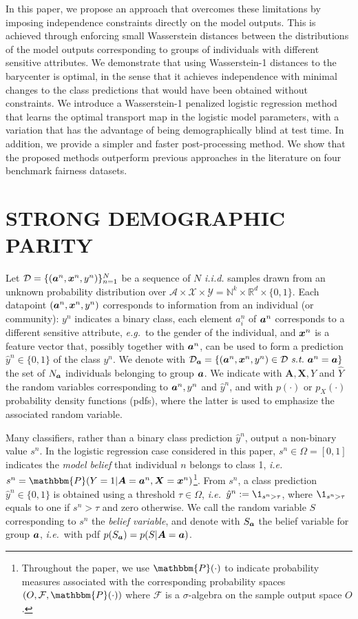 \documentclass[letterpaper]{article}
\newcommand{\ie}{\emph{i.e.}}
\newcommand{\eg}{\emph{e.g.}}
\theoremstyle{definition}
\newcommand{\vA}{\bm{A}}
\newcommand{\vX}{\bm{X}}
\newcommand{\st}{\emph{s.t.}}
\begin{document}
In this paper, we propose an approach that overcomes these limitations by imposing independence constraints directly on the model outputs. This is achieved through enforcing small Wasserstein distances between the distributions of the model outputs corresponding to groups of individuals with different sensitive attributes. We demonstrate that using Wasserstein-1 distances to the barycenter is optimal, in the sense that it achieves independence with minimal changes to the class predictions that would have been obtained without constraints. 
We introduce a Wasserstein-1 penalized logistic regression method that learns the optimal transport map in the logistic model parameters, with a variation that has the advantage of being demographically blind at test time. In addition, we provide a simpler and faster post-processing method. We show that the proposed methods outperform previous approaches in the literature on four benchmark fairness datasets. 

\section{STRONG DEMOGRAPHIC PARITY}
Let $\mathcal{D} =\{({\bm{a}}^n,{\bm{x}}^n,y^n)\}_{n=1}^N$ be a sequence of $N$ \emph{i.i.d.} samples drawn from an unknown probability distribution over $\mathcal{A} \times \mathcal{X} \times \mathcal{Y}=\mathbb{N}^k\times\mathbb{R}^d\times\{0, 1\}$. Each datapoint $({\bm{a}}^n,{\bm{x}}^n,y^n)$ corresponds to information from an individual (or community): $y^n$ 
indicates a binary class, each element $a^n_i$ of ${\bm{a}}^n$ corresponds to a different sensitive attribute, \eg~to the gender of the individual, and 
${\bm{x}}^n$ is a feature vector that, possibly together with ${\bm{a}}^n$, can be used to form a prediction $\hat y^n\in\{0,1\}$ of the class $y^n$. 
We denote with $\mathcal{D}_{\va} = \{ (\va^n, \vx^n, y^n) \in \mathcal{D}~\st~\va^n = \va \}$ the set of $N_{{\bm{a}}}$ individuals belonging to group ${\bm{a}}$. We indicate with $\vA,\vX,Y$ and $\hat Y$ the random variables corresponding to ${\bm{a}}^n,y^n$ and $\hat y^n$, and with $p(\cdot)$ or $p_X(\cdot)$ probability density functions (pdfs), where the latter is used to emphasize the associated random variable. 

Many classifiers, rather than a binary class prediction $\hat y^n$, output a non-binary value $s^n$. In the logistic regression case considered in this paper, $s^n\in\Omega=[0,1]$ indicates the \emph{model belief} that individual $n$ belongs to class 1, \ie~$s^n=\mathbbm{P}(Y=1|\vA = \va^n,\vX=\vx^n)$\footnote{Throughout the paper, we use $\mathbbm{P}(\cdot)$ to indicate probability measures associated with the corresponding probability spaces $(O, \mathcal{F}, \mathbbm{P}(\cdot))$ where $\mathcal{F}$ is a $\sigma$-algebra on the sample output space $O$.}.
From $s^n$, a class prediction $\hat y^n\in\{0,1\}$ is obtained using a threshold $\tau\in\Omega$, \ie~$\hat y^n := \1_{s^n>\tau}$, where $\1_{s^n>\tau}$ equals to one if $s^n>\tau$ and zero otherwise. We call the random variable $S$ corresponding to $s^n$ the \emph{belief variable}, and 
denote with $S_{{\bm{a}}}$ the belief variable for group ${\bm{a}}$, \ie~with pdf $p(S_\va)=p(S|\vA=\va)$. 
\end{document}

